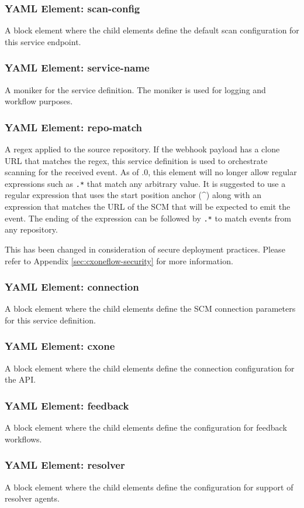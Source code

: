 \subsubsection{YAML Element: scan-config}\label{sec:yaml-moniker-scan-config}
A block element where the child elements define the default scan configuration for this service endpoint.

\subsubsection{YAML Element: service-name}\label{sec:yaml-moniker-service-name}
A moniker for the service definition. The moniker is used for logging and workflow purposes.

\subsubsection{YAML Element: repo-match}\label{sec:yaml-moniker-repo-match}
A regex applied to the source repository.  If the webhook payload has
a clone URL that matches the regex, this service definition is used to orchestrate scanning
for the received event.  As of .0, this element will no longer allow regular
expressions such as \texttt{.*} that match any arbitrary value.  It is suggested to use
a regular expression that uses the start position anchor (\^{}) along with an expression
that matches the URL of the SCM that will be expected to emit the event.  The ending of
the expression can be followed by \texttt{.*} to match events from any repository.

This has been changed in consideration of secure deployment practices.  Please refer to
Appendix \ref{sec:cxoneflow-security} for more information.

\subsubsection{YAML Element: connection}\label{sec:yaml-moniker-connection}
A block element where the child elements define the SCM connection parameters for this service definition.

\subsubsection{YAML Element: cxone}\label{sec:yaml-moniker-cxone}
A block element where the child elements define the connection configuration for the \cxone API. 

\subsubsection{YAML Element: feedback}\label{sec:yaml-moniker-feedback}
A block element where the child elements define the configuration for feedback workflows. 

\subsubsection{YAML Element: resolver}\label{sec:yaml-moniker-resolver}
A block element where the child elements define the configuration for support of resolver agents. 

